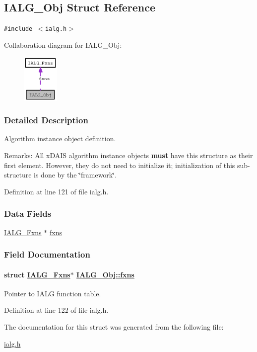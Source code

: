 \hypertarget{struct_i_a_l_g___obj}{
\subsection{IALG\_\-Obj Struct Reference}
\label{struct_i_a_l_g___obj}
}
{\tt \#include $<$ialg.h$>$}

Collaboration diagram for IALG\_\-Obj:\begin{figure}[H]
\begin{center}
\leavevmode
\includegraphics[width=50pt]{struct_i_a_l_g___obj__coll__graph}
\end{center}
\end{figure}


\subsubsection{Detailed Description}
Algorithm instance object definition. 

\begin{Desc}
\item[Remarks:]All x\-DAIS algorithm instance objects {\bf must} have this structure as their first element. However, they do not need to initialize it; initialization of this sub-structure is done by the \char`\"{}framework\char`\"{}. \end{Desc}




Definition at line 121 of file ialg.h.\subsubsection*{Data Fields}
\begin{CompactItemize}
\item 
\hyperlink{struct_i_a_l_g___fxns}{IALG\_\-Fxns} $\ast$ \hyperlink{struct_i_a_l_g___obj_a80d0fb968dce61561689d3793bd5b6c}{fxns}
\end{CompactItemize}


\subsubsection{Field Documentation}
\hypertarget{struct_i_a_l_g___obj_a80d0fb968dce61561689d3793bd5b6c}{
\paragraph[fxns]{\setlength{\rightskip}{0pt plus 5cm}struct \hyperlink{struct_i_a_l_g___fxns}{IALG\_\-Fxns}$\ast$ \hyperlink{struct_i_a_l_g___obj_a80d0fb968dce61561689d3793bd5b6c}{IALG\_\-Obj::fxns}}\hfill}
\label{struct_i_a_l_g___obj_a80d0fb968dce61561689d3793bd5b6c}


Pointer to IALG function table. 

Definition at line 122 of file ialg.h.

The documentation for this struct was generated from the following file:\begin{CompactItemize}
\item 
\hyperlink{ialg_8h}{ialg.h}\end{CompactItemize}
